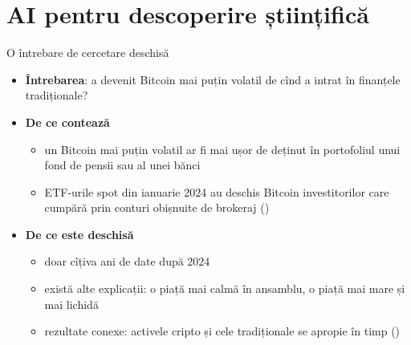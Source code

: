 \section{AI pentru descoperire științifică}

\begin{frame}{O întrebare de cercetare deschisă}
\itemsize{\small}
\begin{itemize}
    \item \textbf{Întrebarea}: a devenit Bitcoin mai puțin volatil de cînd a intrat în finanțele tradiționale?
    \item \textbf{De ce contează}
    \begin{itemize}
        \item un Bitcoin mai puțin volatil ar fi mai ușor de deținut în portofoliul unui fond de pensii sau al unei bănci
        \item ETF-urile spot din ianuarie 2024 au deschis Bitcoin investitorilor care cumpără prin conturi obișnuite de brokeraj ()
    \end{itemize}
    \item \textbf{De ce este deschisă}
    \begin{itemize}
        \item doar cîțiva ani de date după 2024
        \item există alte explicații: o piață mai calmă în ansamblu, o piață mai mare și mai lichidă
        \item rezultate conexe: activele cripto și cele tradiționale se apropie în timp ()
    \end{itemize}
\end{itemize}
\end{frame}

